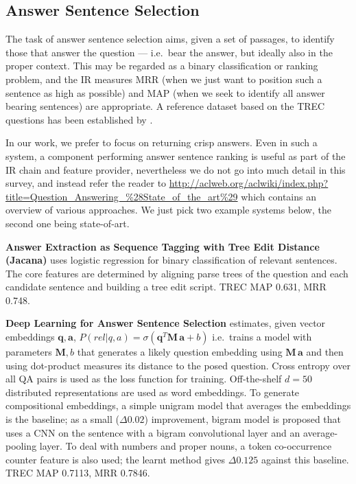 \subsection{Answer Sentence Selection}
\label{sec:anssentsel}

The task of answer sentence selection aims, given a set of passages,
to identify those that answer the question --- i.e.\ bear the answer, but
ideally also in the proper context.
This may be regarded as a binary classification or ranking problem,
and the IR measures MRR (when we just want to position such a sentence
as high as possible) and MAP (when we seek to identify all answer bearing
sentences) are appropriate.
A reference dataset based on the TREC questions has been established
by \cite{WangQAGrammar}.

In our work, we prefer to focus on returning crisp answers.
Even in such a system, a component performing answer sentence ranking
is useful as part of the IR chain and feature provider,
nevertheless we do not go into much detail in this survey,
and instead refer the reader to
\url{http://aclweb.org/aclwiki/index.php?title=Question_Answering_\%28State_of_the_art\%29}
	which contains an overview of various approaches.
	We just pick two example systems below, the second
	one being state-of-art.


\textbf{Answer Extraction as Sequence Tagging with Tree Edit Distance (Jacana)} \citep{TreeEdit2013Yao}
	uses logistic regression for binary classification of
	relevant sentences.  The core features are determined
	by aligning parse trees of the question and each candidate
	sentence and building a tree edit script.
	TREC MAP 0.631, MRR 0.748.

\textbf{Deep Learning for Answer Sentence Selection} \citep{Yu2014Deep}
	estimates, given vector embeddings $\mathbf{q}, \mathbf{a}$,
	$P(rel|q,a) = \sigma(\mathbf{q}^T \mathbf{M}\, \mathbf{a} + b)$
	i.e.\ trains a model with parameters $\mathbf{M}, b$ that
	generates a likely question embedding using $\mathbf{M}\, \mathbf{a}$
	and then using dot-product measures its distance to the posed question.
	Cross entropy over all QA pairs is used as the loss function for training.
	Off-the-shelf $d=50$ distributed representations %
	are used as word embeddings.
	To generate compositional embeddings,
	a simple unigram model that averages the embeddings is the baseline;
	as a small ($\Delta 0.02$) improvement, bigram model is proposed that uses a CNN
	on the sentence with a bigram convolutional layer and an average-pooling layer.
	To deal with numbers and proper nouns, a token co-occurrence counter
	feature is also used; the learnt method gives $\Delta 0.125$ against this baseline.
	TREC MAP 0.7113, MRR 0.7846.


